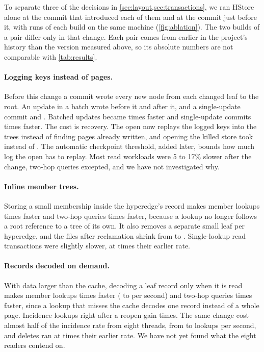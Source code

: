 To separate three of the decisions in \cref{sec:layout,sec:transactions}, we ran HStore alone at the commit that introduced each of them and at the commit just before it, with  runs of each build on the same machine (\cref{fig:ablation}). The two builds of a pair differ only in that change. Each pair comes from earlier in the project's history than the version measured above, so its absolute numbers are not comparable with \cref{tab:results}.

\paragraph{Logging keys instead of pages.} Before this change a commit wrote every new node from each changed leaf to the root. An update in a batch wrote  before it and  after it, and a single-update commit  and . Batched updates became  times faster and single-update commits  times faster. The cost is recovery. The open now replays the logged keys into the trees instead of finding pages already written, and opening the killed store took  instead of . The automatic checkpoint threshold, added later, bounds how much log the open has to replay. Most read workloads were 5 to 17\% slower after the change, two-hop queries excepted, and we have not investigated why.

\paragraph{Inline member trees.} Storing a small membership inside the hyperedge's record makes member lookups  times faster and two-hop queries  times faster, because a lookup no longer follows a root reference to a tree of its own. It also removes a separate small leaf per hyperedge, and the files after reclamation shrink from  to . Single-lookup read transactions were slightly slower, at  times their earlier rate.

\paragraph{Records decoded on demand.} With data larger than the cache, decoding a leaf record only when it is read makes member lookups  times faster ( to  per second) and two-hop queries  times faster, since a lookup that misses the cache decodes one record instead of a whole page. Incidence lookups right after a reopen gain  times. The same change cost almost half of the incidence rate from eight threads, from  to  lookups per second, and deletes ran at  times their earlier rate. We have not yet found what the eight readers contend on.

